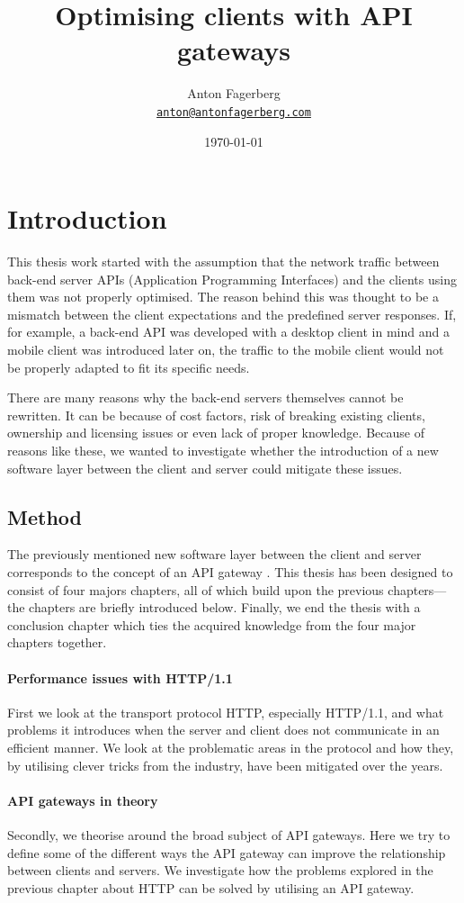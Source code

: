 \documentclass{cslthse-msc}
\author{
	Anton Fagerberg \\
	{\normalsize \href{mailto:anton@antonfagerberg.com}{\texttt{anton@antonfagerberg.com}}}
}
\title{Optimising clients with API gateways}
\subtitle{}
\date{\today}
\begin{document}
\makefrontmatter

\chapter{Introduction}
This thesis work started with the assumption that the network traffic between back-end server APIs (Application Programming Interfaces) and the clients using them was not properly optimised. The reason behind this was thought to be a mismatch between the client expectations and the predefined server responses. If, for example, a back-end API was developed with a desktop client in mind and a mobile client was introduced later on, the traffic to the mobile client would not be properly adapted to fit its specific needs.

There are many reasons why the back-end servers themselves cannot be rewritten. It can be because of cost factors, risk of breaking existing clients, ownership and licensing issues or even lack of proper knowledge. Because of reasons like these, we wanted to investigate whether the introduction of a new software layer between the client and server could mitigate these issues.

\section{Method}

The previously mentioned new software layer between the client and server corresponds to the concept of an API gateway \cite{api_gateway}. This thesis has been designed to consist of four majors chapters, all of which build upon the previous chapters---the chapters are briefly introduced below. Finally, we end the thesis with a conclusion chapter which ties the acquired knowledge from the four major chapters together.

\subsubsection{Performance issues with HTTP/1.1}
First we look at the transport protocol HTTP, especially HTTP/1.1, and what problems it introduces when the server and client does not communicate in an efficient manner. We look at the problematic areas in the protocol and how they, by utilising clever tricks from the industry, have been mitigated over the years.

\subsubsection{API gateways in theory}
Secondly, we theorise around the broad subject of API gateways. Here we try to define some of the different ways the API gateway can improve the relationship between clients and servers. We investigate how the problems explored in the previous chapter about HTTP can be solved by utilising an API gateway.
\end{document}
